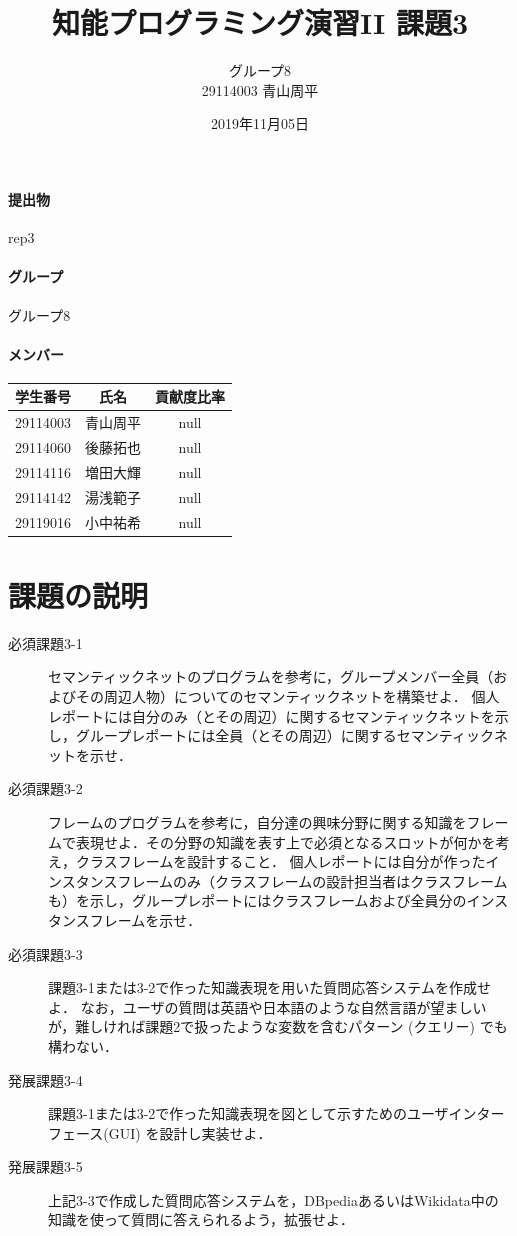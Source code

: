 \documentclass[12pt]{jarticle}
\title{知能プログラミング演習II 課題3}
\author{グループ8\\
  29114003 青山周平\\
}
\date{2019年11月05日}
\begin{document}
\maketitle

\paragraph{提出物} rep3
\paragraph{グループ} グループ8
\paragraph{メンバー}
\begin{tabular}{|c|c|c|}
  \hline
  学生番号&氏名&貢献度比率\\
  \hline\hline
  29114003&青山周平&null\\
  \hline
  29114060&後藤拓也&null\\
  \hline
  29114116&増田大輝&null\\
  \hline
  29114142&湯浅範子&null\\
  \hline
  29119016&小中祐希&null\\
  \hline
\end{tabular}



\section{課題の説明}
\begin{description}
\item[必須課題3-1] セマンティックネットのプログラムを参考に，グループメンバー全員（およびその周辺人物）についてのセマンティックネットを構築せよ．
個人レポートには自分のみ（とその周辺）に関するセマンティックネットを示し，グループレポートには全員（とその周辺）に関するセマンティックネットを示せ．
\item[必須課題3-2] フレームのプログラムを参考に，自分達の興味分野に関する知識をフレームで表現せよ．その分野の知識を表す上で必須となるスロットが何かを考え，クラスフレームを設計すること．
個人レポートには自分が作ったインスタンスフレームのみ（クラスフレームの設計担当者はクラスフレームも）を示し，グループレポートにはクラスフレームおよび全員分のインスタンスフレームを示せ．
\item[必須課題3-3] 課題3-1または3-2で作った知識表現を用いた質問応答システムを作成せよ．
なお，ユーザの質問は英語や日本語のような自然言語が望ましいが，難しければ課題2で扱ったような変数を含むパターン (クエリー) でも構わない． 
\item[発展課題3-4] 課題3-1または3-2で作った知識表現を図として示すためのユーザインターフェース(GUI) を設計し実装せよ．
\item[発展課題3-5] 上記3-3で作成した質問応答システムを，DBpediaあるいはWikidata中の知識を使って質問に答えられるよう，拡張せよ．
\end{description}
\end{document}
